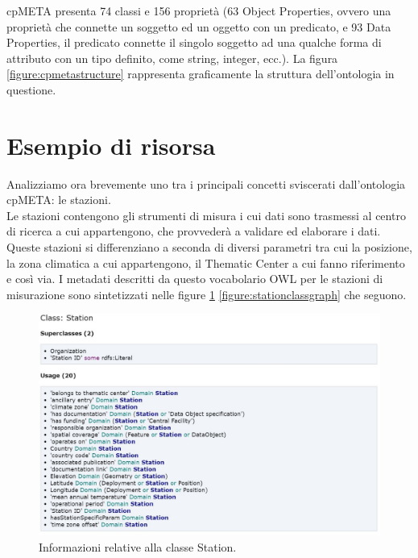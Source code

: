 cpMETA presenta 74 classi e 156 proprietà (63 Object Properties, ovvero
una proprietà che connette un soggetto ed un oggetto con un
predicato, e 93 Data Properties, il predicato connette il
singolo soggetto ad una qualche forma di attributo con un tipo
definito, come string, integer, ecc.). La figura \ref{figure:cpmetastructure}
rappresenta graficamente la struttura dell'ontologia in questione.

\newpage

\section{Esempio di risorsa}
\label{section:esempidirisorse}
Analizziamo ora brevemente uno tra i principali concetti
sviscerati dall'ontologia cpMETA: le stazioni.\\

Le stazioni contengono gli strumenti di misura i cui dati
sono trasmessi al centro di ricerca a cui appartengono,
che provvederà a validare ed elaborare i dati.
Queste stazioni si differenziano a seconda di diversi
parametri tra cui la posizione,
la zona climatica a cui appartengono, il Thematic 
Center a cui fanno riferimento e così via. I metadati
descritti da questo vocabolario OWL per le stazioni di misurazione
sono sintetizzati nelle figure \ref{figure:stationclass} \ref{figure:stationclassgraph} che seguono.

\begin{figure}[h!]
    \centering
    \includegraphics[height=0.6\textwidth]{figures/stationOWL.JPG}
    \caption{Informazioni relative alla classe Station.}
    \label{figure:stationclass}
\end{figure}

